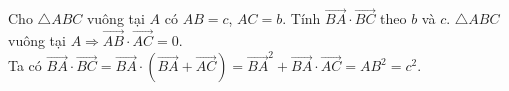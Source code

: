 \begin{bt}%
	Cho $\triangle ABC$ vuông tại $A$ có $AB=c$, $AC=b$. Tính $\overrightarrow{BA}\cdot \overrightarrow{BC}$ theo $b$ và $c$.
	\loigiai
	{
		$\triangle ABC$ vuông tại $A\Rightarrow \overrightarrow{AB}\cdot\overrightarrow{AC}=0$.\\
		Ta có $\overrightarrow{BA}\cdot \overrightarrow{BC}=\overrightarrow{BA}\cdot\left (\overrightarrow{BA}+\overrightarrow{AC} \right )=\overrightarrow{BA}^2+\overrightarrow{BA}\cdot\overrightarrow{AC}=AB^2=c^2$.
	}
\end{bt}



